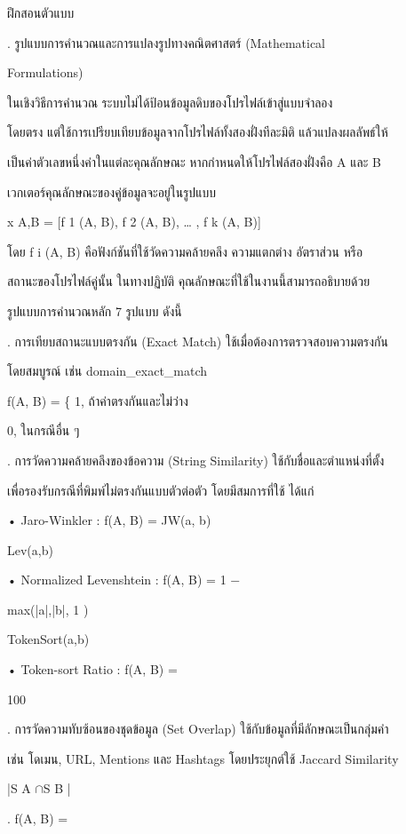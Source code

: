 \documentclass[12pt,a4paper]{report}
\begin{document}
ฝึกสอนตัวแบบ\par
{}. รูปแบบการคำนวณและการแปลงรูปทางคณิตศาสตร์ (Mathematical\par
Formulations)\par
ในเชิงวิธีการคำนวณ ระบบไม่ได้ป้อนข้อมูลดิบของโปรไฟล์เข้าสู่แบบจำลอง\par
โดยตรง แต่ใช้การเปรียบเทียบข้อมูลจากโปรไฟล์ทั้งสองฝั่งทีละมิติ แล้วแปลงผลลัพธ์ให้\par
เป็นค่าตัวเลขหนึ่งค่าในแต่ละคุณลักษณะ หากกำหนดให้โปรไฟล์สองฝั่งคือ A และ B\par
เวกเตอร์คุณลักษณะของคู่ข้อมูลจะอยู่ในรูปแบบ\par
x A,B = [f 1 (A, B), f 2 (A, B), … , f k (A, B)]\par
\clearpage
โดย f i (A, B) คือฟังก์ชันที่ใช้วัดความคล้ายคลึง ความแตกต่าง อัตราส่วน หรือ\par
สถานะของโปรไฟล์คู่นั้น ในทางปฏิบัติ คุณลักษณะที่ใช้ในงานนี้สามารถอธิบายด้วย\par
รูปแบบการคำนวณหลัก 7 รูปแบบ ดังนี้\par
{}. การเทียบสถานะแบบตรงกัน (Exact Match) ใช้เมื่อต้องการตรวจสอบความตรงกัน\par
โดยสมบูรณ์ เช่น domain\_exact\_match\par
f(A, B) = \{ 1, ถ้าค่าตรงกันและไม่ว่าง\par
0, ในกรณีอื่น ๆ\par
{}. การวัดความคล้ายคลึงของข้อความ (String Similarity) ใช้กับชื่อและตำแหน่งที่ตั้ง\par
เพื่อรองรับกรณีที่พิมพ์ไม่ตรงกันแบบตัวต่อตัว โดยมีสมการที่ใช้ ได้แก่\par
\noindent • Jaro-Winkler : f(A, B) = JW(a, b)\par
Lev(a,b)\par
\noindent • Normalized Levenshtein : f(A, B) = 1 −\par
max(|a|,|b|, 1 )\par
TokenSort(a,b)\par
\noindent • Token-sort Ratio : f(A, B) =\par
100\par
{}. การวัดความทับซ้อนของชุดข้อมูล (Set Overlap) ใช้กับข้อมูลที่มีลักษณะเป็นกลุ่มคำ\par
เช่น โดเมน, URL, Mentions และ Hashtags โดยประยุกต์ใช้ Jaccard Similarity\par
|S A \ensuremath{\cap}S B |\par
{}. f(A, B) =\par
\end{document}
